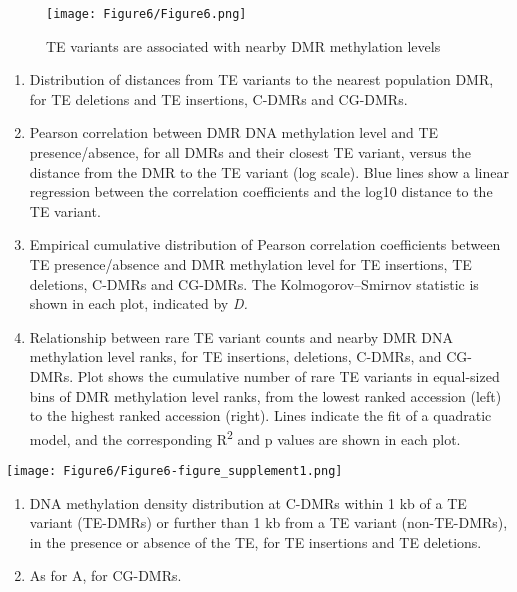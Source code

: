 \documentclass[12pt]{article}
\begin{document}
\pagebreak


\begin{figure}[!ht]
  \centering
  \texttt{[image: Figure6/Figure6.png]}
  \caption{TE variants are associated with nearby DMR methylation levels}
  \label{fig6}
\end{figure}


\begin{enumerate}
\def\labelenumi{(\Alph{enumi})}
\item
  Distribution of distances from TE variants to the nearest population
  DMR, for TE deletions and TE insertions, C-DMRs and CG-DMRs.
\item
  Pearson correlation between DMR DNA methylation level and TE
  presence/absence, for all DMRs and their closest TE variant, versus
  the distance from the DMR to the TE variant (log scale). Blue lines
  show a linear regression between the correlation coefficients and the
  log10 distance to the TE variant.
\item
  Empirical cumulative distribution of Pearson correlation coefficients
  between TE presence/absence and DMR methylation level for TE
  insertions, TE deletions, C-DMRs and CG-DMRs. The Kolmogorov--Smirnov
  statistic is shown in each plot, indicated by \emph{D.}
\item
  Relationship between rare TE variant counts and nearby DMR DNA
  methylation level ranks, for TE insertions, deletions, C-DMRs, and
  CG-DMRs. Plot shows the cumulative number of rare TE variants in
  equal-sized bins of DMR methylation level ranks, from the lowest
  ranked accession (left) to the highest ranked accession (right). Lines
  indicate the fit of a quadratic model, and the corresponding R\textsuperscript{2} and p
  values are shown in each plot.
\end{enumerate}

\pagebreak


\setcounter{suppfigure}{5}

\begin{suppfigure}
  \centering
  \texttt{[image: Figure6/Figure6-figure\_supplement1.png]}
  \caption{figure supplement 1}
  \label{fig6s1}
\end{suppfigure}

\begin{enumerate}
\def\labelenumi{(\Alph{enumi})}
\item
  DNA methylation density distribution at C-DMRs within 1 kb of a TE
  variant (TE-DMRs) or further than 1 kb from a TE variant
  (non-TE-DMRs), in the presence or absence of the TE, for TE insertions
  and TE deletions.
\item
  As for A, for CG-DMRs.
\end{enumerate}
\end{document}
